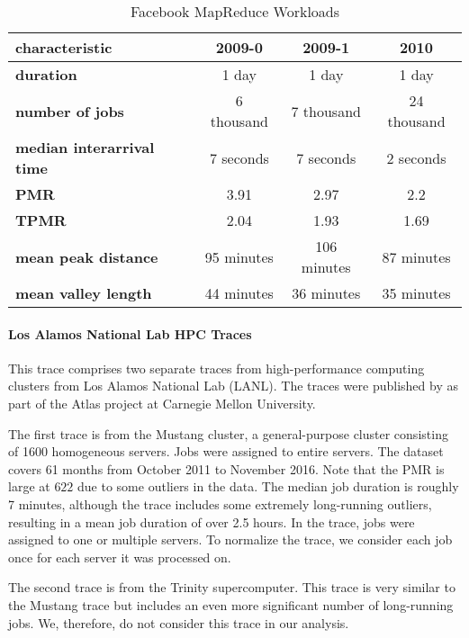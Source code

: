 \begin{table}[]
    \centering
    \begin{tabular}{>{\bfseries\centering}l|c|c|c}
        characteristic & 2009-0 & 2009-1 & 2010 \\\hline
        duration & 1 day & 1 day & 1 day \\
        number of jobs & 6 thousand & 7 thousand & 24 thousand \\
        median interarrival time & 7 seconds & 7 seconds & 2 seconds \\
        PMR & 3.91 & 2.97 & 2.2 \\
        TPMR & 2.04 & 1.93 & 1.69 \\
        mean peak distance & 95 minutes & 106 minutes & 87 minutes \\
        mean valley length & 44 minutes & 36 minutes & 35 minutes \\
    \end{tabular}
    \caption{Facebook MapReduce Workloads}
    \label{tab:facebook}
\end{table}

\paragraph{Los Alamos National Lab HPC Traces \cite{Amvrosiadis2018_3, Amvrosiadis2018, Amvrosiadis2018_2}} This trace comprises two separate traces from high-performance computing clusters from Los Alamos National Lab (LANL). The traces were published by \citeauthor*{Amvrosiadis2018} as part of the Atlas project at Carnegie Mellon University.

The first trace is from the Mustang cluster, a general-purpose cluster consisting of 1600 homogeneous servers. Jobs were assigned to entire servers. The dataset covers 61 months from October 2011 to November 2016. Note that the PMR is large at $622$ due to some outliers in the data. The median job duration is roughly 7 minutes, although the trace includes some extremely long-running outliers, resulting in a mean job duration of over 2.5 hours. In the trace, jobs were assigned to one or multiple servers. To normalize the trace, we consider each job once for each server it was processed on.

The second trace is from the Trinity supercomputer. This trace is very similar to the Mustang trace but includes an even more significant number of long-running jobs. We, therefore, do not consider this trace in our analysis.

